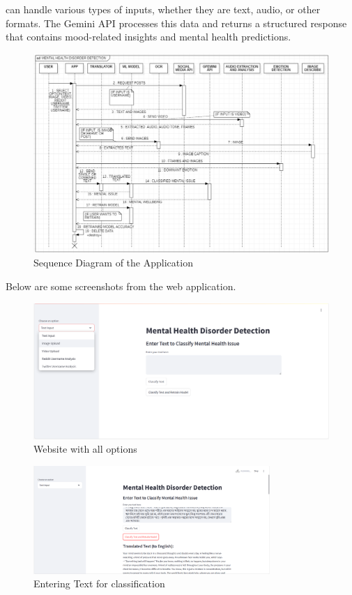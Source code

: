 can handle various types of inputs, whether they are text, audio, or other formats. The Gemini API processes this data and returns a structured response that contains mood-related insights and mental health predictions.
    
\begin{figure}[h!]  
    \centering
    \includegraphics[width=1.0\textwidth]{Images/Sequence Diagram.png}  
    \caption{Sequence Diagram of the Application}
    \label{012i}  %
\end{figure}

\noindent
Below are some screenshots from the web application.

\begin{figure}[h!]  
    \centering
    \includegraphics[width=1.0\textwidth]{App Images/01 Interface.png}  
    \caption{Website with all options}
    \label{01i}  %
\end{figure}

\pagebreak

\begin{figure}[h!]  
    \centering
    \includegraphics[width=0.8\textwidth]{App Images/02 Interface.png}  
    \caption{Entering Text for classification}
    \label{02i}  %
\end{figure}

